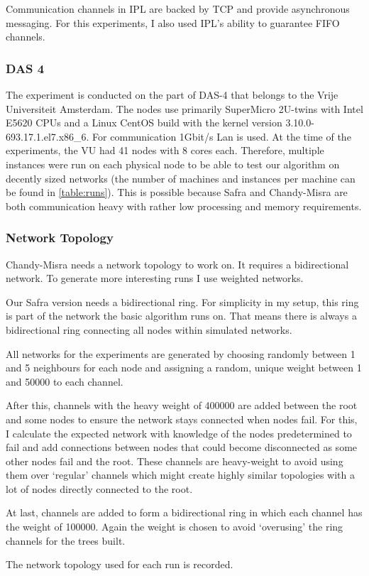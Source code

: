 Communication channels in IPL are backed by TCP and provide asynchronous messaging.
For this experiments, I also used IPL's ability to guarantee FIFO channels.

\subsubsection{DAS 4}
The experiment is conducted on the part of DAS-4 that belongs to the Vrije Universiteit Amsterdam.
The nodes use primarily SuperMicro 2U-twins with Intel E5620 CPUs and a Linux CentOS build with the kernel version 3.10.0-693.17.1.el7.x86\_6.
For communication 1Gbit/s Lan is used.
At the time of the experiments, the VU had 41 nodes with 8 cores each.
Therefore, multiple instances were run on each physical node to be able to test our algorithm on decently sized networks (the number of machines and instances per machine can be found in \cref{table:runs}).
This is possible because Safra and Chandy-Misra are both communication heavy with rather low processing and memory requirements.

\newpage
\subsubsection{Network Topology}
Chandy-Misra needs a network topology to work on.
It requires a bidirectional network.
To generate more interesting runs I use weighted networks.

Our Safra version needs a bidirectional ring.
For simplicity in my setup, this ring is part of the network the basic algorithm runs on.
That means there is always a bidirectional ring connecting all nodes within simulated networks.

All networks for the experiments are generated by choosing randomly between 1 and 5 neighbours for each node and assigning a random, unique weight between 1 and 50000 to each channel.

After this, channels with the heavy weight of 400000 are added between the root and some nodes to ensure the network stays connected when nodes fail.
For this, I calculate the expected network with knowledge of the nodes predetermined to fail and add connections between nodes that could become disconnected as some other nodes fail and the root.
These channels are heavy-weight to avoid using them over `regular' channels which might create highly similar topologies with a lot of nodes directly connected to the root.

At last, channels are added to form a bidirectional ring in which each channel has the weight of 100000.
Again the weight is chosen to avoid `overusing' the ring channels for the trees built.

The network topology used for each run is recorded.

